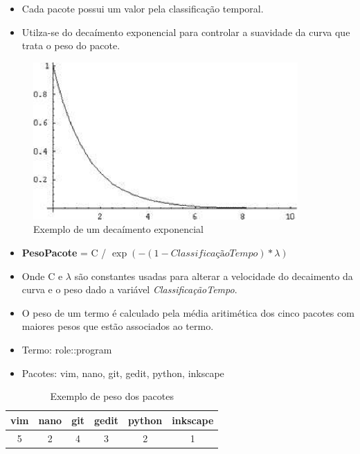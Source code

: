 \begin{frame}
    \begin{itemize}
        \item Cada pacote possui um valor pela classificação temporal.
        \item Utilza-se do decaímento exponencial para controlar a suavidade da
curva que trata o peso do pacote.
    \end{itemize}

    \begin{figure}[h]
      \centering
      \includegraphics[width=0.9\textwidth]{figura/decaimento_exponencial.eps}
      \caption{Exemplo de um decaímento exponencial}
      \label{fig:curva_aprendizado}
    \end{figure}
\end{frame}

\begin{frame}
\begin{itemize}
    \item \textbf{PesoPacote} = C / $\exp\left(-({1 - ClassificaçãoTempo}) * {\lambda}\right)$
    \item Onde C e ${\lambda}$ são constantes usadas para alterar a velocidade do
decaimento da curva e o peso dado a variável \textit{ClassificaçãoTempo}.
\end{itemize}
\end{frame}

\begin{frame}
    \begin{itemize}
        \item O peso de um termo é calculado pela média aritimética dos cinco
pacotes com maiores pesos que estão associados
ao termo.
        \item Termo: role::program
        \item Pacotes: vim, nano, git, gedit, python, inkscape
    \end{itemize}
    \begin{table}[h]
    \centering
    \begin{tabular}{cccccc}
    \hline
    \rowcolor[HTML]{EFEFEF}
    {vim} & {nano} & {git} & {gedit} & {python} & {inkscape} \\ \hline
    {5} & {2} & {4} & {3} & {2} & {1} \\ \hline
    \end{tabular}
    \caption{Exemplo de peso dos pacotes}
    \label{tab:classificacao_pacotes}
    \end{table}
\end{frame}


